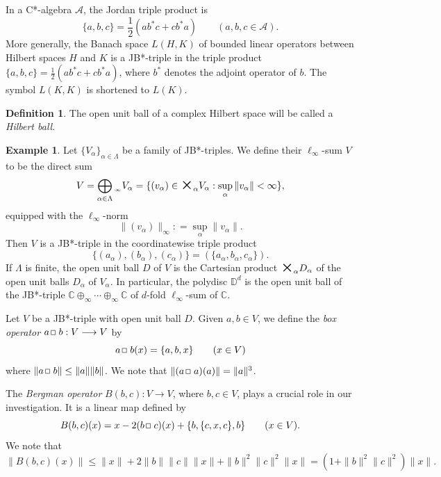 \documentclass[12pt, twoside]{article}
\def\sqr#1#2{{\,\vcenter{\vbox{\hrule height.#2pt\hbox{\vrule width.#2pt
height#1pt \kern#1pt\vrule width.#2pt}\hrule height.#2pt}}\,}}
\def\bo{\sqr44\,}
\theoremstyle{definition}
\newtheorem{example}[theorem]{Example}
\newtheorem*{xdefn}{Definition}
\numberwithin{equation}{section}
\begin{document}
In a C*-algebra $\mathcal{A}$, the Jordan triple product is
$$\{a,b,c\} = \frac{1}{2}(ab^*c + cb^*a) \qquad (a,b,c \in \mathcal{A}).$$
More generally, the Banach space $L(H,K)$ of bounded linear operators between Hilbert spaces $H$ and $K$
 is a JB*-triple in
the triple product $\{a,b,c\} = \frac{1}{2}(ab^*c + cb^*a)$, where $b^*$ denotes the adjoint operator of $b$.
The symbol $L(K,K)$ is shortened to $L(K)$.

\begin{xdefn} The open unit ball of a complex Hilbert space will be called
a {\it Hilbert ball}.
\end{xdefn}

\begin{example}\label{ellinfty}
 Let $\{V_\alpha\}_{\alpha \in \Lambda}$ be a family of JB*-triples.  We define their $\ell_\infty$-sum
$V$ to be the direct sum
$$V=\bigoplus_{\alpha \in \Lambda} {}_{_\infty} V_\alpha = \{ (v_\alpha) \in \mbox{\Large$\boldsymbol\times$}_\alpha V_\alpha
: \sup_\alpha \|v_\alpha\| < \infty\},$$
equipped with the $\ell_\infty$-norm
$$\|(v_\alpha)\|_\infty : =\sup_\alpha \|v_\alpha\|.$$
Then $V$ is a JB*-triple in the coordinatewise triple product
$$\{(a_\alpha), (b_\alpha), (c_\alpha)\} = ( \{a_\alpha, b_\alpha, c_\alpha\}).$$
If $\Lambda$ is finite, the open unit ball $D$ of $V$ is the Cartesian product
$\mbox{\Large$\boldsymbol\times$}_\alpha D_\alpha$ of the open unit balls $D_\alpha$ of $V_\alpha$.
In particular, the polydisc $\mathbb{D}^d$ is the open unit ball of the JB*-triple
$\mathbb{C}\oplus_\infty \cdots \oplus_\infty \mathbb{C}$ of $d$-fold $\ell_\infty$-sum  of $\mathbb{C}$.
\end{example}


Let  $V$ be a JB*-triple with open unit ball $D$.
Given $a,b\in V$, we define the {\it box operator}
$a\bo b: V \longrightarrow V$ by
$$a\bo b (x) = \{a,b,x\} \qquad (x\in V)$$
where $\|a\bo b\| \leq \|a\|\|b\|$. We note that $\|(a\bo a)(a)\| = \|a\|^3$.

  The {\it Bergman operator} $B(b,c): V\longrightarrow V$, where $b,c \in V$, plays a crucial role
in our investigation. It is a linear map defined by
\begin{equation}\label{b1}
B(b,c)(x) = x - 2(b\bo c)(x)+\{b,\{c,x,c\},b\} \qquad (x\in V).
\end{equation}
We note that
\begin{equation}\label{bbcx}
\|B(b,c)(x)\| \leq \|x\| + 2\|b\|\|c\|\|x\| + \|b\|^2\|c\|^2\|x\| = (1+\|b\|^2\|c\|^2)\|x\|.
\end{equation}
\end{document}
